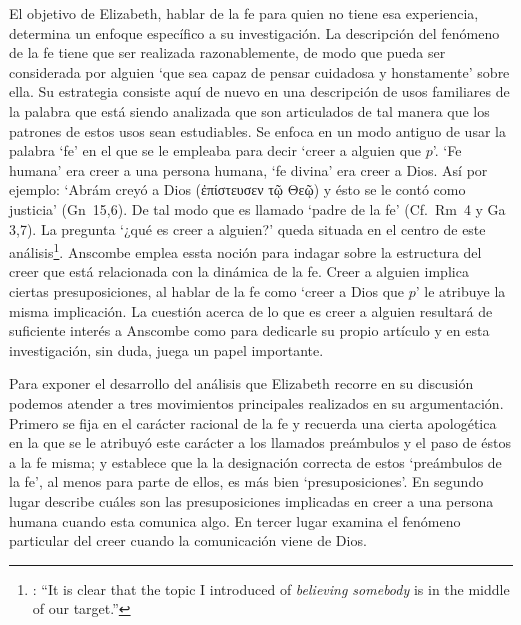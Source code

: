 El objetivo de Elizabeth, hablar de la fe para quien no tiene esa experiencia, determina un enfoque específico a su investigación. La descripción del fenómeno de la fe tiene que ser realizada razonablemente, de modo que pueda ser considerada por alguien \enquote*{que sea capaz de pensar cuidadosa y honstamente} sobre ella. Su estrategia consiste aquí de nuevo en una descripción de usos familiares de la palabra que está siendo analizada que son articulados de tal manera que los patrones de estos usos sean estudiables\autocite[Cf.~][12]{bakerhacker2009understanding}. Se enfoca en un modo antiguo de usar la palabra `fe' en el que se le empleaba para decir \enquote*{creer a alguien que $p$}. `Fe humana' era creer a una persona humana, `fe divina' era creer a Dios\autocite[Cf.~][2]{anscombe2008faith:tobelieve}. Así por ejemplo: \enquote*{Abrám creyó a Dios (\textgreek{ἐπίστευσεν τῷ Θεῷ}) y ésto se le contó como justicia} (Gn~15,6). De tal modo que es llamado \enquote*{padre de la fe} (Cf.~Rm~4 y Ga 3,7). La pregunta \enquote*{¿qué es creer a alguien?} queda situada en el centro de este análisis\footnote{\cite[Cf.~][116]{anscombe1981erp:faith}: \enquote{It is clear that the topic I introduced of \emph{believing somebody} is in the middle of our target.}}. Anscombe emplea essta noción para indagar sobre la estructura del creer que está relacionada con la dinámica de la fe. Creer a alguien implica ciertas presuposiciones, al hablar de la fe como \enquote*{creer a Dios que $p$} le atribuye la misma implicación. La cuestión acerca de lo que es creer a alguien resultará de suficiente interés a Anscombe como para dedicarle su propio artículo y en esta investigación, sin duda, juega un papel importante.

Para exponer el desarrollo del análisis que Elizabeth recorre en su discusión podemos atender a tres movimientos principales realizados en su argumentación. Primero se fija en el carácter racional de la fe y recuerda una cierta apologética en la que se le atribuyó este carácter a los llamados preámbulos y el paso de éstos a la fe misma; y establece que la la designación correcta de estos `preámbulos de la fe', al menos para parte de ellos, es más bien `presuposiciones'. En segundo lugar describe cuáles son las presuposiciones implicadas en creer a una persona humana cuando esta comunica algo. En tercer lugar examina el fenómeno particular del creer cuando la comunicación viene de Dios.

